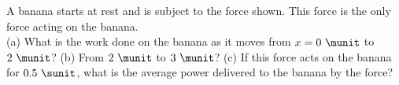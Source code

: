 A banana starts at rest and is subject to the force shown.
This force is the only force acting on the banana.\\
%
(a) What is the work done on the banana as it moves from $x = 0\ \munit$
to $2\ \munit$?\answercheck\hwendpart
%
(b) From $2\ \munit$ to $3\ \munit$?\answercheck\hwendpart
%
(c) If this force acts on the banana for $0.5\ \sunit$, what
is the average power delivered to the banana by the force?
